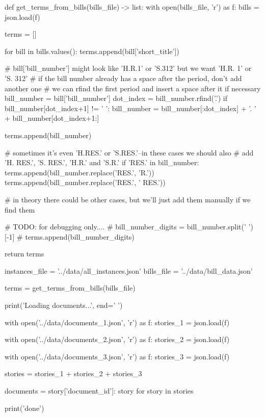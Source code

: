 \begin{pyin}
def get_terms_from_bills(bills_file) -> list:
    with open(bills_file, 'r') as f:
        bills = json.load(f)

    terms = []

    for bill in bills.values():
        terms.append(bill['short_title'])

        # bill['bill_number'] might look like 'H.R.1' or 'S.312' but we want 'H.R. 1' or 'S. 312'
        # if the bill number already has a space after the period, don't add another one
        # we can rfind the first period and insert a space after it if necessary
        bill_number = bill['bill_number']
        dot_index = bill_number.rfind('.')
        if bill_number[dot_index+1] != ' ':
            bill_number = bill_number[:dot_index] + '. ' + bill_number[dot_index+1:]

        terms.append(bill_number)

        # sometimes it's even 'H.RES.' or 'S.RES.'--in these cases we should also
        # add 'H. RES.', 'S. RES.', 'H.R.' and 'S.R.'
        if 'RES.' in bill_number:
            terms.append(bill_number.replace('RES.', 'R.'))
            terms.append(bill_number.replace('RES.', ' RES.'))

        # in theory there could be other cases, but we'll just add them manually if we find them

        # TODO: for debugging only....
        # bill_number_digits = bill_number.split(' ')[-1]
        # terms.append(bill_number_digits)

    return terms
\end{pyin}

\begin{pyin}
instances_file = '../data/all_instances.json'
bills_file = '../data/bill_data.json'

terms = get_terms_from_bills(bills_file)
\end{pyin}

\begin{pyin}
print('Loading documents...', end=' ')

with open('../data/documents_1.json', 'r') as f:
    stories_1 = json.load(f)

with open('../data/documents_2.json', 'r') as f:
    stories_2 = json.load(f)

with open('../data/documents_3.json', 'r') as f:
    stories_3 = json.load(f)

stories = stories_1 + stories_2 + stories_3

documents = {story['document_id']: story for story in stories}

print('done')
\end{pyin}

